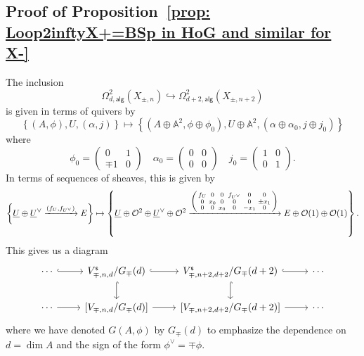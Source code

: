 \documentclass{amsart}
\theoremstyle{definition}
\renewcommand{\AA} {{\mathbb A}}
\newcommand{\OO}{\mathcal{O}}
\newcommand{\UL}[1]{\underline{#1}}
\newcommand{\alg}{\mathsf{alg}}
\newcommand{\stable}{\mathsf{s}}
\newcommand{\LoopTwo}{\Omega^{2}_{d,\alg}}
\begin{document}
\subsection{Proof of Proposition~\ref{prop: Loop2inftyX+=BSp in HoG and similar for X-}}
  
The inclusion
\[
\LoopTwo (X_{\pm ,n})\hookrightarrow \Omega^{2}_{d+2,\alg}(X_{\pm ,n+2})
\]
is given in terms of quivers by
\[
\left\{(A,\phi ),U,(\alpha ,j) \right\} \mapsto \left\{(A\oplus
\AA^{2},\phi\oplus \phi_{0} ),U\oplus \AA^{2},(\alpha\oplus \alpha_{0}
,j\oplus j_{0}) \right\} 
\]
where
\[
\phi_{0} = \begin{pmatrix} 0&1\\\mp 1&0  \end{pmatrix}\quad
\alpha_{0}=\begin{pmatrix} 0&0\\0&0  \end{pmatrix}\quad
j_{0}=\begin{pmatrix} 1&0\\0&1  \end{pmatrix}. 
\]
In terms of sequences of sheaves, this is given by 
\[
\left\{\UL{U}\oplus \UL{U}^{\vee}\xrightarrow{(f_{U},f_{U^{\vee}})} E
\right\} \mapsto
\left\{\UL{U}\oplus \OO^{2}\oplus \UL{U}^{\vee}\oplus
\OO^{2}\xrightarrow{\begin{psmallmatrix} f_{U}&0&0&f_{U^{\vee}} &0&0\\
0&x_{0}&0&0&0&\pm x_{1}\\
0&0&x_{0}&0&-x_{1}&0  \end{psmallmatrix}} E\oplus \OO (1)\oplus \OO (1) \right\}.
\]
This gives us a diagram
\begin{equation}\label{digram: Vnd/Gd --> Vn+2d+2/Gd+2}
\begin{tikzcd}
    \cdots \arrow[r, hook]
    & V^{\stable}_{\mp ,n,d}/G_{\mp }(d) \arrow[r, hook] \arrow[d, hook]
    & V^{\stable}_{\mp ,n+2,d+2}/G_{\mp }(d+2)  \arrow[r, hook] \arrow[d, hook] & \cdots \\
    \cdots \arrow[r]
    & \left[ V_{\mp ,n,d}/G_{\mp }(d)\right] \arrow[r]
    & \left[V_{\mp ,n+2,d+2}/G_{\mp }(d+2) \right] 
\arrow[r] & \cdots
\end{tikzcd}
\end{equation}
where we have denoted $G(A,\phi )$ by $G_{\mp}(d)$ to emphasize the
dependence on $d=\dim A$ and the sign of the form $\phi^{\vee}=\mp
\phi$.
\end{document}
